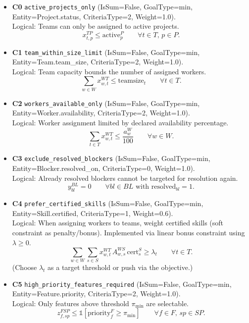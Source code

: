 \documentclass[11pt,a4paper]{article}
\begin{document}
\begin{itemize}[leftmargin=2.2em]
  \item \textbf{C0} \texttt{active\_projects\_only} (IsSum=False, GoalType=min, Entity=Project.status, CriteriaType=2, Weight=1.0). \\
  Logical: Teams can only be assigned to active projects. \\
  \[
  x^{TP}_{t,p} \le \text{active}^P_p \qquad \forall t\in T,\, p\in P.
  \]

  \item \textbf{C1} \texttt{team\_within\_size\_limit} (IsSum=False, GoalType=min, Entity=Team.team\_size, CriteriaType=2, Weight=1.0). \\
  Logical: Team capacity bounds the number of assigned workers. \\
  \[
  \sum_{w\in W} x^{WT}_{w,t} \le \text{teamsize}_{t} \qquad \forall t\in T.
  \]

  \item \textbf{C2} \texttt{workers\_available\_only} (IsSum=False, GoalType=min, Entity=Worker.availability, CriteriaType=2, Weight=1.0). \\
  Logical: Worker assignment limited by declared availability percentage. \\
  \[
  \sum_{t\in T} x^{WT}_{w,t} \le \frac{a^{W}_{w}}{100} \qquad \forall w\in W.
  \]

  \item \textbf{C3} \texttt{exclude\_resolved\_blockers} (IsSum=False, GoalType=min, Entity=Blocker.resolved\_on, CriteriaType=0, Weight=1.0). \\
  Logical: Already resolved blockers cannot be targeted for resolution again. \\
  \[
  y^{BL}_{bl} = 0 \qquad \forall bl\in BL \text{ with } \text{resolved}_{bl}=1.
  \]

  \item \textbf{C4} \texttt{prefer\_certified\_skills} (IsSum=False, GoalType=min, Entity=Skill.certified, CriteriaType=1, Weight=0.6). \\
  Logical: When assigning workers to teams, weight certified skills (soft constraint as penalty/bonus). Implemented via linear bonus constraint using $\lambda\ge 0$. \\
  \[
  \sum_{w\in W}\sum_{s\in S} x^{WT}_{w,t}\, A^{WS}_{w,s}\,\text{cert}^{S}_s \ge \lambda_t \qquad \forall t\in T.
  \]
  (Choose $\lambda_t$ as a target threshold or push via the objective.)

  \item \textbf{C5} \texttt{high\_priority\_features\_required} (IsSum=False, GoalType=min, Entity=Feature.priority, CriteriaType=2, Weight=1.0). \\
  Logical: Only features above threshold $\pi_{\min}$ are selectable. \\
  \[
  z^{FSP}_{f,sp} \le \mathbb{1}[\text{priority}^F_f \ge \pi_{\min}] \qquad \forall f\in F,\, sp\in SP.
  \]


\end{itemize}
\end{document}
